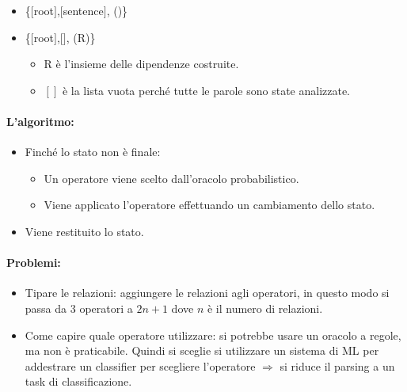 \begin{itemize}
  \item {} \{$[$root$]$,$[$sentence$]$, ()\}
  \item {} \{$[$root$]$,$[$$]$, (R)\} 
    \begin{itemize}
      \item R è l'insieme delle dipendenze costruite. 
      \item  $[]$ è la lista vuota perché tutte le parole sono state analizzate.
    \end{itemize}

\end{itemize}

\paragraph{L'algoritmo:}

\begin{itemize}
  \item Finché lo stato non è finale: 
    \begin{itemize}
      \item Un operatore viene scelto dall'oracolo probabilistico. 
      \item Viene applicato l'operatore effettuando un cambiamento dello stato.
    \end{itemize}
  \item Viene restituito lo stato.
\end{itemize}


\paragraph{Problemi:}

\begin{itemize}
  \item Tipare le relazioni: aggiungere le relazioni agli operatori, in questo modo si passa da 3 operatori a $2n + 1$ dove $n$ è il numero di relazioni. 
  \item Come capire quale operatore utilizzare: si potrebbe usare un oracolo a regole, ma non è praticabile. Quindi si sceglie si utilizzare un sistema di ML per addestrare un classifier per scegliere l'operatore $\Rightarrow$ si riduce il parsing a un task di classificazione.
\end{itemize}


